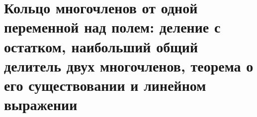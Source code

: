 \section{Кольцо многочленов от одной переменной над полем: деление с остатком, наибольший общий делитель двух многочленов, теорема о его существовании и линейном выражении}